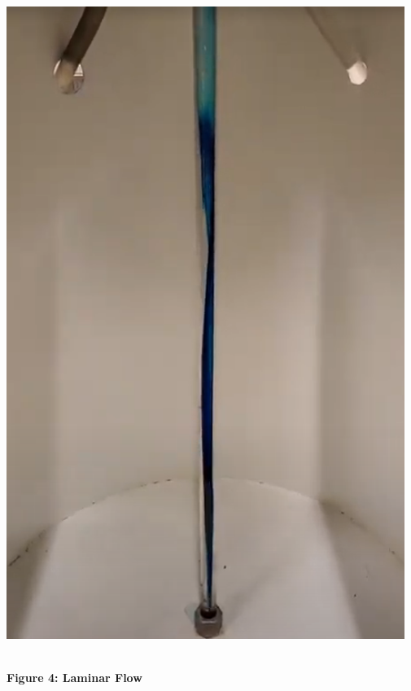 \documentclass{article}
\begin{document}
\begin{center}
    \includegraphics*[scale=0.3]{fig2.png}
    \vspace{-2mm}
    {\large{\bf \\Figure 4: Laminar Flow\\}}
    \vspace{3mm}

\end{center}
\end{document}

